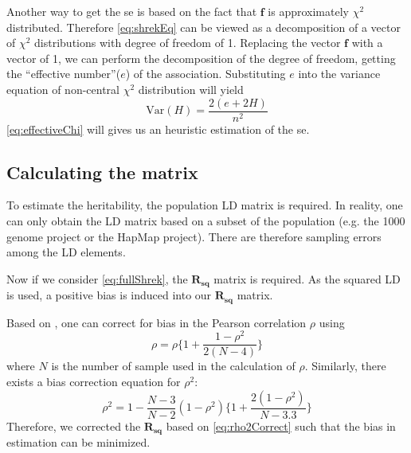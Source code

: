 \documentclass{book}
\begin{document}
			Another way to get the \gls{se} is based on the fact that $\boldsymbol{f}$ is approximately $\chi^2$ distributed. 
			Therefore \cref{eq:shrekEq} can be viewed as a decomposition of a vector of $\chi^2$ distributions with degree of freedom of 1. 
			Replacing the vector $\boldsymbol{f}$ with a vector of 1, we can perform the decomposition of the degree of freedom, getting the ``effective number''($e$) of the association\citep{Li2011b}. 
			Substituting $e$ into the variance equation of non-central $\chi^2$ distribution will yield
			\begin{equation}
			\mathrm{Var}(H) = \frac{2(e+2H)}{n^2}
			\label{eq:effectiveChi}
			\end{equation}
			 \cref{eq:effectiveChi} will gives us an heuristic estimation of the \gls{se}. 
		\subsection{Calculating the  matrix}
			To estimate the heritability, the population \gls{LD} matrix is required.
			In reality, one can only obtain the \gls{LD} matrix based on a subset of the population (e.g. the 1000 genome project\parencite{Project2012} or the HapMap project\parencite{Altshuler2010}).
			There are therefore sampling errors among the \gls{LD} elements. 
			
			Now if we consider \cref{eq:fullShrek}, the $\boldsymbol{R_{sq}}$ matrix is required.
			As the squared \gls{LD} is used, a positive bias is induced into our $\boldsymbol{R_{sq}}$ matrix. 
			
			Based on \citet{Shieh2010}, one can correct for bias in the Pearson correlation $\rho$ using
			\begin{equation}
			\rho = \rho\{1+\frac{1-\rho^2}{2(N-4)}\}
			\label{eq:rhoCorrect}
			\end{equation}
			where $N$ is the number of sample used in the calculation of $\rho$. 
			Similarly, there exists a bias correction equation for $\rho^2$:
			\begin{equation}
				\rho^2=1-\frac{N-3}{N-2}(1-\rho^2)\{1+\frac{2(1-\rho^2)}{N-3.3}\}
				\label{eq:rho2Correct}
			\end{equation}
			Therefore, we corrected the $\boldsymbol{R_{sq}}$ based on \cref{eq:rho2Correct} such that the bias in estimation can be minimized. 
\end{document}
